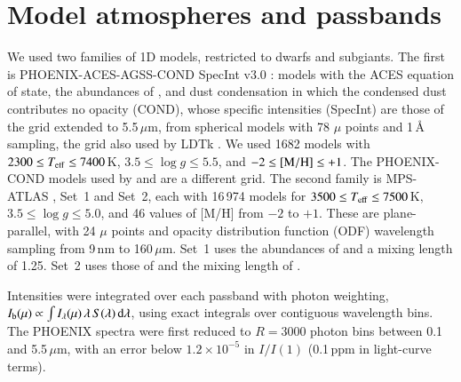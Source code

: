\documentclass{aa}
\newcommand{\ppm}{\,\textrm{ppm}}
\newcommand{\teff}{T_{\rm eff}}
\begin{document}
\section{Model atmospheres and passbands}\label{sec:models}
We used two families of 1D models, restricted to dwarfs and subgiants. The
first is PHOENIX-ACES-AGSS-COND SpecInt v3.0 \citep{husser2013}: models with
the ACES equation of state, the abundances of \citet{asplund2009}, and dust
condensation in which the condensed dust contributes no opacity (COND), whose specific intensities (SpecInt) are
those of the \citet{husser2013} grid extended to 5.5\,$\mu$m,
from spherical models with 78 $\mu$ points and 1\,\AA{} sampling, the grid
also used by LDTk \citep{parviainen2015}. We used 1682
models with $2300\le\teff\le7400$\,K, $3.5\le\log g\le5.5$, and
$-2\le[{\rm M/H}]\le+1$. The PHOENIX-COND models used by
\citet{claret2012,claret2013} and \citet{claretsouthworth2023} are a different
grid. The second family is MPS-ATLAS \citep{witzke2021,kostogryz2022}, Set~1
and Set~2, each with 16\,974 models for $3500\le\teff\le7500$\,K,
$3.5\le\log g\le5.0$, and 46 values of [M/H] from $-2$ to $+1$. These are
plane-parallel, with 24 $\mu$ points and opacity distribution function (ODF)
wavelength sampling from 9\,nm to 160\,$\mu$m. Set~1 uses the abundances of
\citet{grevesse1998} and a mixing length of 1.25. Set~2 uses those of
\citet{asplund2009} and the mixing length of \citet{viani2018}.

Intensities were integrated over each passband with photon weighting,
$I_{\rm b}(\mu)\propto\int I_\lambda(\mu)\,\lambda\,S(\lambda)\,{\rm d}\lambda$,
using exact integrals over contiguous wavelength bins. The PHOENIX spectra were
first reduced to $R=3000$ photon bins between 0.1 and 5.5\,$\mu$m, with an
error below $1.2\times10^{-5}$ in $I/I(1)$ (0.1\ppm{} in light-curve terms).
\end{document}
